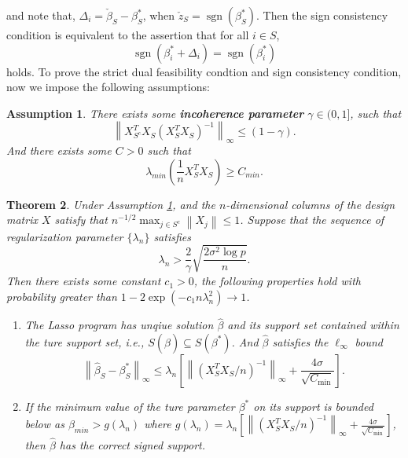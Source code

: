 \documentclass[12pt]{article}
\numberwithin{equation}{section}
\newtheorem{theorem}{Theorem}[section]
\newtheorem{assumption}[theorem]{Assumption}
\begin{document}
and note that, $\Delta_{i}=\check{\beta}_{S}-\beta_{S}^{*}$, when $\check{z}_{S}=\operatorname{sgn}\left(\beta_{S}^{*}\right)$.
Then the sign consistency condition is equivalent to  the assertion that for all $i \in S$, 
\begin{equation}\label{7.10}
\operatorname{sgn}\left(\beta_{i}^{*}+\Delta_{i}\right)=\operatorname{sgn}(\beta_{i}^{*})
\end{equation}
holds. To prove the strict dual feasibility condtion and sign consistency condition, now we impose the following assumptions:
\begin{assumption}\label{assumption 7.3}
	There exists some \textbf{incoherence parameter} $\gamma \in (0,1]$, such that
	\begin{equation}\label{7.11}
	\left\|X_{S^{c}}^{T} X_{S}\left(X_{S}^{T} X_{S}\right)^{-1}\right\|_{\infty} \leq(1-\gamma).
	\end{equation}
	And there exists some $C>0$ such that
	\begin{equation}\label{7.12}
	\lambda_{min}\left(\frac{1}{n} X_{S}^{T} X_{S}\right)\geq C_{min}.
	\end{equation}
\end{assumption}
\begin{theorem}
	Under Assumption \ref{assumption 7.3}, and the $n$-dimensional columns of the design matrix $X$ satisfy that $n^{-1 / 2} \max _{j \in S^{c}}\left\|X_{j}\right\| \leq 1$. Suppose that the sequence of regularization parameter $\{\lambda_n\}$ satisfies
	\begin{equation}\label{7.13}
	\lambda_{n}>\frac{2}{\gamma} \sqrt{\frac{2 \sigma^{2} \log p}{n}}.
	\end{equation}
	Then there exists some constant $c_1>0$, the following properties hold with probability greater than $1-2\exp \left(-c_{1} n \lambda_{n}^{2}\right) \rightarrow 1$.
	\begin{enumerate}
		\item The Lasso program has unqiue solution $\hat \beta$ and its support set contained within the ture support set, i.e., $S(\widehat{\beta}) \subseteq S\left(\beta^{*}\right)$. And $\hat \beta$ satisfies the $\ell_{\infty}$ bound
		\begin{equation}\label{7.14}
		\left\|\widehat{\beta}_{S}-\beta^{*}_{S}\right\|_{\infty} \leq \lambda_{n}\left[\left\|\left(X_{S}^{T} X_{S} / n\right)^{-1}\right\|_{\infty}+\frac{4 \sigma}{\sqrt{C_{\min }}}\right].
		\end{equation}
		\item If the minimum value of the ture parameter $\beta^{*}$ on its support is bounded below as $\beta_{min}>g(\lambda_n)$ where $g(\lambda_n)=\lambda_{n}\left[\left\|\left(X_{S}^{T} X_{S} / n\right)^{-1}\right\|_{\infty}+\frac{4 \sigma}{\sqrt{C_{\min }}}\right]$, then $\hat \beta$ has the correct signed support.
	\end{enumerate}
\end{theorem}
\end{document}
